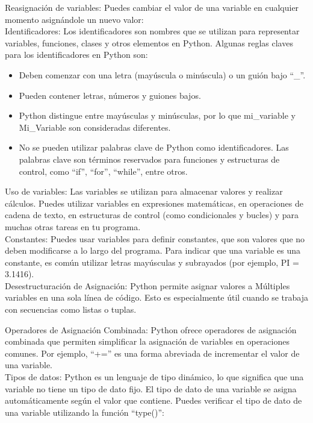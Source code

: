 Reasignación de variables: Puedes cambiar el valor de una variable en cualquier momento asignándole un nuevo valor:\\

Identificadores: Los identificadores son nombres que se utilizan para representar variables, funciones, clases y otros elementos en Python. Algunas reglas claves para los identificadores en Python son:

\begin{itemize}
    \item Deben comenzar con una letra (mayúscula o minúscula) o un guión bajo ``\_''.
    \item Pueden contener letras, números y guiones bajos.
    \item Python distingue entre mayúsculas y minúsculas, por lo que mi\_variable y Mi\_Variable son consideradas diferentes.
    \item No se pueden utilizar palabras clave de Python como identificadores. Las palabras clave son términos reservados para funciones y estructuras de control, como ``if'', ``for'', ``while'', entre otros.
\end{itemize}

Uso de variables: Las variables se utilizan para almacenar valores y realizar cálculos. Puedes utilizar variables en expresiones matemáticas, en operaciones de cadena de texto, en estructuras de control (como condicionales y bucles) y para muchas otras tareas en tu programa.\\

Constantes: Puedes usar variables para definir constantes, que son valores que no deben modificarse a lo largo del programa. Para indicar que una variable es una constante, es común utilizar letras mayúsculas y subrayados (por ejemplo, PI = 3.1416).\\

Desestructuración de Asignación: Python permite asignar valores a Múltiples variables en una sola línea de código. Esto es especialmente útil cuando se trabaja con secuencias como listas o tuplas.

Operadores de Asignación Combinada: Python ofrece operadores de asignación combinada que permiten simplificar la asignación de variables en operaciones comunes. Por ejemplo, ``+='' es una forma abreviada de incrementar el valor de una variable.\\


Tipos de datos: Python es un lenguaje de tipo dinámico, lo que significa que una variable no tiene un tipo de dato fijo. El tipo de dato de una variable se asigna automáticamente según el valor que contiene. Puedes verificar el tipo de dato de una variable utilizando la función ``type()'':\\

